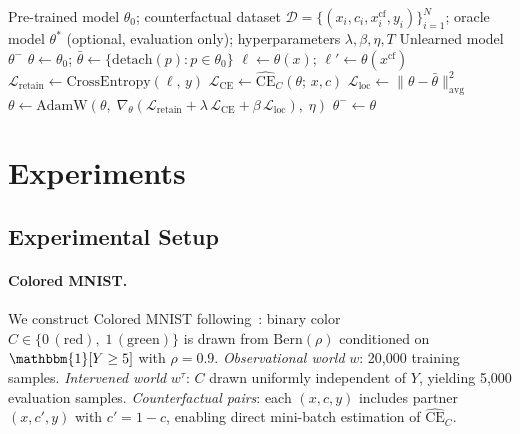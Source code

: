 \documentclass{article}
\newcommand{\CE}{\mathrm{CE}}
\begin{document}
\begin{algorithm}[h]
\caption{Post-Hoc Causal Concept Unlearning}
\label{alg:unlearning}
\begin{algorithmic}[1]
\Require Pre-trained model $\theta_0$; counterfactual dataset
  $\mathcal{D} = \{(x_i, c_i, x_i^{\mathrm{cf}}, y_i)\}_{i=1}^N$;
  oracle model $\theta^*$ (optional, evaluation only);
  hyperparameters $\lambda, \beta, \eta, T$
\Ensure Unlearned model $\theta^-$
\State $\theta \leftarrow \theta_0$;\quad
  $\bar{\theta} \leftarrow \{\mathrm{detach}(p) : p \in \theta_0\}$
    \State $\ell \leftarrow \theta(x)$; $\ell' \leftarrow \theta(x^{\mathrm{cf}})$
    \State $\mathcal{L}_{\mathrm{retain}} \leftarrow \mathrm{CrossEntropy}(\ell,\, y)$
    \State $\mathcal{L}_{\mathrm{CE}} \leftarrow \widehat{\CE}_C(\theta;\, x, c)$ 
    \State $\mathcal{L}_{\mathrm{loc}} \leftarrow \|\theta - \bar{\theta}\|^2_{\mathrm{avg}}$
    \State $\theta \leftarrow \mathrm{AdamW}\!\left(\theta,\;
      \nabla_\theta(\mathcal{L}_{\mathrm{retain}}
      + \lambda\,\mathcal{L}_{\mathrm{CE}}
      + \beta\,\mathcal{L}_{\mathrm{loc}}),\; \eta\right)$
  \EndFor
\EndFor
\State \Return $\theta^- \leftarrow \theta$
\end{algorithmic}
\end{algorithm}

\section{Experiments}
\label{sec:experiments}

\subsection{Experimental Setup}

\paragraph{Colored MNIST.}
We construct Colored MNIST following~\citet{arjovsky2019irm}: binary color
$C \in \{0\,(\mathrm{red}),\; 1\,(\mathrm{green})\}$ is drawn from
$\mathrm{Bern}(\rho)$ conditioned on $\mathbbm{1}[Y \geq 5]$ with $\rho = 0.9$.
\emph{Observational world} $w$: 20{,}000 training samples.
\emph{Intervened world} $w^\tau$: $C$ drawn uniformly independent of $Y$,
yielding 5{,}000 evaluation samples.
\emph{Counterfactual pairs}: each $(x, c, y)$ includes partner $(x, c', y)$
with $c' = 1-c$, enabling direct mini-batch estimation of $\widehat{\CE}_C$.
\end{document}
